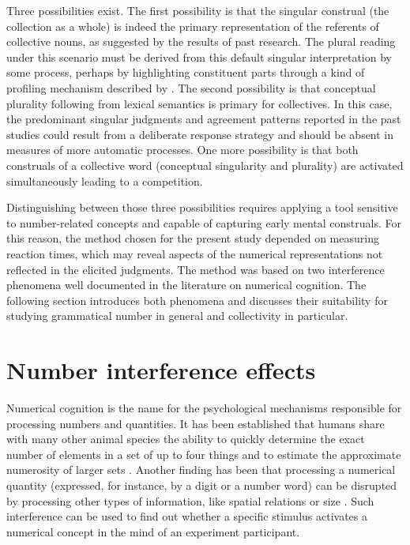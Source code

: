 \documentclass[output=paper]{langscibook}
\begin{document}
Three possibilities exist. The first possibility is that the singular construal (the collection as a whole) is indeed the primary representation of the referents of collective nouns, as suggested by the results of past research. The plural reading under this scenario must be derived from this default singular interpretation by some process, perhaps by highlighting constituent parts through a kind of profiling mechanism described by \citet{lagnackerConceptImageSymbol1991}. The second possibility is that conceptual plurality following from lexical semantics is primary for collectives. In this case, the predominant singular judgments and agreement patterns reported in the past studies could result from a deliberate response strategy and should be absent in measures of more automatic processes. One more possibility is that both construals of a collective word (conceptual singularity and plurality) are activated simultaneously leading to a competition. 

Distinguishing between those three possibilities requires applying a tool sensitive to number-related concepts and capable of capturing early mental construals. For this reason, the method chosen for the present study depended on measuring reaction times, which may reveal aspects of the numerical representations not reflected in the elicited judgments. The method was based on two interference phenomena well documented in the literature on numerical cognition. The following section introduces both phenomena and discusses their suitability for studying grammatical number in general and collectivity in particular.

\section{Number interference effects}
Numerical cognition is the name for the psychological mechanisms responsible for processing numbers and quantities. It has been established that humans share with many other animal species the ability to quickly determine the exact number of elements in a set of up to four things and to estimate the approximate numerosity of larger sets \citep{feigensonCoreSystemsNumber2004}. Another finding has been that processing a numerical quantity (expressed, for instance, by a digit or a number word) can be disrupted by processing other types of information, like spatial relations or size \citep{dehaeneMentalRepresentationParity1993,henikThreeGreaterFive1982,fitousiRoleParityPhysical2009,cohenkadoshEffectOrientationNumber2007}. Such interference can be used to find out whether a specific stimulus activates a numerical concept in the mind of an experiment participant.
\end{document}
